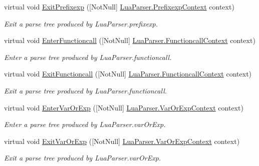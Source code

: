 \begin{DoxyCompactItemize}
virtual void \mbox{\hyperlink{classzlua_1_1_lua_base_listener_a2d2173a2484aac9cb7e09010ca3170e9}{Exit\+Prefixexp}} (\mbox{[}Not\+Null\mbox{]} \mbox{\hyperlink{classzlua_1_1_lua_parser_1_1_prefixexp_context}{Lua\+Parser.\+Prefixexp\+Context}} context)
\begin{DoxyCompactList}\small\item\em Exit a parse tree produced by Lua\+Parser.\+prefixexp. \end{DoxyCompactList}\item 
virtual void \mbox{\hyperlink{classzlua_1_1_lua_base_listener_a5a20690d44ed7bea5265200a10bd3ade}{Enter\+Functioncall}} (\mbox{[}Not\+Null\mbox{]} \mbox{\hyperlink{classzlua_1_1_lua_parser_1_1_functioncall_context}{Lua\+Parser.\+Functioncall\+Context}} context)
\begin{DoxyCompactList}\small\item\em Enter a parse tree produced by Lua\+Parser.\+functioncall. \end{DoxyCompactList}\item 
virtual void \mbox{\hyperlink{classzlua_1_1_lua_base_listener_ac08101b052d2965f37939320ba03e792}{Exit\+Functioncall}} (\mbox{[}Not\+Null\mbox{]} \mbox{\hyperlink{classzlua_1_1_lua_parser_1_1_functioncall_context}{Lua\+Parser.\+Functioncall\+Context}} context)
\begin{DoxyCompactList}\small\item\em Exit a parse tree produced by Lua\+Parser.\+functioncall. \end{DoxyCompactList}\item 
virtual void \mbox{\hyperlink{classzlua_1_1_lua_base_listener_a0af6c7cb47cd8734025f965a6817bf12}{Enter\+Var\+Or\+Exp}} (\mbox{[}Not\+Null\mbox{]} \mbox{\hyperlink{classzlua_1_1_lua_parser_1_1_var_or_exp_context}{Lua\+Parser.\+Var\+Or\+Exp\+Context}} context)
\begin{DoxyCompactList}\small\item\em Enter a parse tree produced by Lua\+Parser.\+var\+Or\+Exp. \end{DoxyCompactList}\item 
virtual void \mbox{\hyperlink{classzlua_1_1_lua_base_listener_a741486bd709e9d345238f2f706e4e44b}{Exit\+Var\+Or\+Exp}} (\mbox{[}Not\+Null\mbox{]} \mbox{\hyperlink{classzlua_1_1_lua_parser_1_1_var_or_exp_context}{Lua\+Parser.\+Var\+Or\+Exp\+Context}} context)
\begin{DoxyCompactList}\small\item\em Exit a parse tree produced by Lua\+Parser.\+var\+Or\+Exp. \end{DoxyCompactList}\item 

\end{DoxyCompactItemize}
